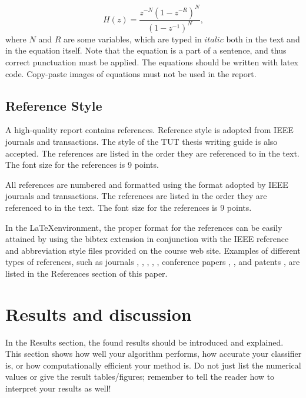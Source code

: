 \documentclass{article}
\begin{document}
%
\begin{equation}\label{eq:example1}
  H(z) = \frac{z^{-N}(1-z^{-R})^{N}}{(1-z^{-1})^{N}},
\end{equation}
%
where ${N}$ and ${R}$ are some variables, which are typed in $italic$ both in the text and in the equation itself. Note that the equation is a part of a sentence, and thus correct punctuation must be applied. The equations should be written with latex code. Copy-paste images of equations must not be used in the report.

\subsection{Reference Style}
\label{ssec:refstyle}

A high-quality report contains references. Reference style is adopted from IEEE journals and transactions. The style of the TUT thesis writing guide is also accepted. The references are listed in the order they are referenced to in the text. The font size for the references is 9 points.

All references are numbered and formatted using the format adopted by IEEE journals and transactions. The references are listed in the order they are referenced to in the text. The font size for the references is 9 points.

In the \LaTeX environment, the proper format for the references can be easily attained by using the bibtex extension in conjunction with the IEEE reference and abbreviation style files provided on the course web site. Examples of different types of references, such as journals \cite{j:chandrakasan92}, \cite{j:cijvat02}, \cite{j:considine}, \cite{j:polyphase}, \cite{j:vaidyanathan90}, conference papers \cite{c:fettweis99}, \cite{c:yang96}, and patents \cite{p:mecchia02}, are listed in the References section of this paper.

\section{Results and discussion}
\label{sec:results}

In the Results section, the found results should be introduced and explained. This section shows how well your algorithm performs, how accurate your classifier is, or how computationally efficient your method is. Do not just list the numerical values or give the result tables/figures; remember to tell the reader how to interpret your results as well!
\end{document}

